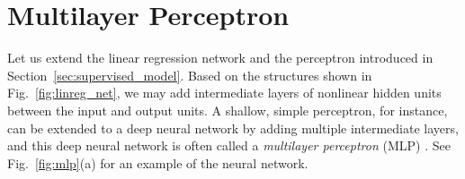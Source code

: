 \documentclass{now}
\begin{document}
\section{Multilayer Perceptron}
\label{sec:mlp}

Let us extend the linear regression network and the perceptron introduced in
Section~\ref{sec:supervised_model}.  Based on the structures shown in
Fig.~\ref{fig:linreg_net}, we may add intermediate layers of nonlinear hidden
units between the input and output units. A shallow, simple perceptron, for
instance, can be extended to a deep neural network by adding multiple
intermediate layers, and this deep neural network is often called a
\textit{multilayer perceptron} (MLP)
\citep{Rosenblatt1962}. See Fig.~\ref{fig:mlp}(a) for an example of the neural
network.
\end{document}
